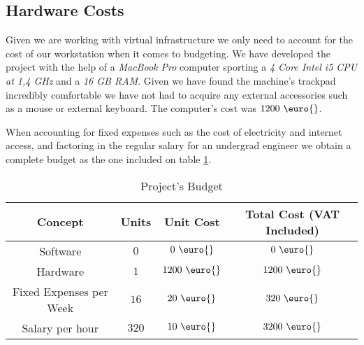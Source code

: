         \subsection{Hardware Costs}
            Given we are working with virtual infrastructure we only need to account for the cost of our workstation when it comes to budgeting. We have developed the project with the help of a \textit{MacBook Pro} computer sporting a \textit{4 Core Intel i5 CPU at 1,4 GHz} and a \textit{16 GB RAM}. Given we have found the machine's trackpad incredibly comfortable we have not had to acquire any external accessories such as a mouse or external keyboard. The computer's cost was $1200\ \text{\euro{}}$.

        When accounting for fixed expenses such as the cost of electricity and internet access, and factoring in the regular salary for an undergrad engineer we obtain a complete budget as the one included on table \ref{tab:budget}.

        \begin{table}
            \centering
            \begin{tabular}{|c|c|c|c|}
                \hline
                \textbf{Concept} & \textbf{Units} & \textbf{Unit Cost} & \textbf{Total Cost (VAT Included)}\\
                \hline
                Software & $0$ & $0\ \text{\euro{}}$ & $0\ \text{\euro{}}$\\
                \hline
                Hardware & $1$ & $1200\ \text{\euro{}}$ & $1200\ \text{\euro{}}$\\
                \hline
                Fixed Expenses per Week & $16$ & $20\ \text{\euro{}}$ & $320\ \text{\euro{}}$\\
                \hline
                Salary per hour & $320$ & $10\ \text{\euro{}}$ & $3200\ \text{\euro{}}$\\
                \hline
            \end{tabular}
            \caption{Project's Budget}
            \label{tab:budget}
        \end{table}
